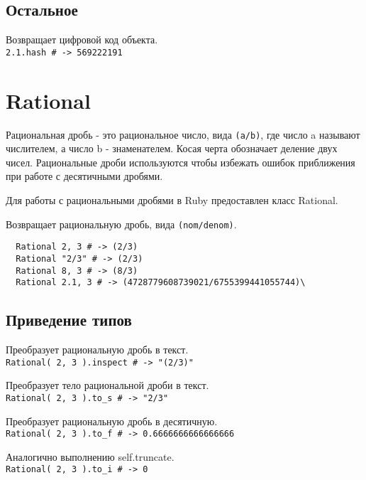 \subsection*{Остальное}

\begin{methodlist}
  Возвращает цифровой код объекта.
  \\\verb!2.1.hash # -> 569222191!
\end{methodlist}

\section{Rational}

Рациональная дробь - это рациональное число, вида \verb!(a/b)!, где число a называют числителем, а число b - знаменателем. Косая черта обозначает деление двух чисел. Рациональные дроби используются чтобы избежать ошибок приближения при работе с десятичными дробями.

Для работы с рациональными дробями в Ruby предоставлен класс Rational. 

\begin{methodlist}
  Возвращает рациональную дробь, вида \verb!(nom/denom)!. 
  \begin{verbatim}
  Rational 2, 3 # -> (2/3) 
  Rational "2/3" # -> (2/3) 
  Rational 8, 3 # -> (8/3) 
  Rational 2.1, 3 # -> (4728779608739021/6755399441055744)\
  \end{verbatim}
\end{methodlist}

\subsection*{Приведение типов}

\begin{methodlist}
  Преобразует рациональную дробь в текст. 
  \\\verb!Rational( 2, 3 ).inspect # -> "(2/3)"!

  Преобразует тело рациональной дроби в текст. 
  \\\verb!Rational( 2, 3 ).to_s # -> "2/3"!

  Преобразует рациональную дробь в десятичную. 
  \\\verb!Rational( 2, 3 ).to_f # -> 0.6666666666666666!

  Аналогично выполнению self.truncate.
  \\\verb!Rational( 2, 3 ).to_i # -> 0!

\end{methodlist}

